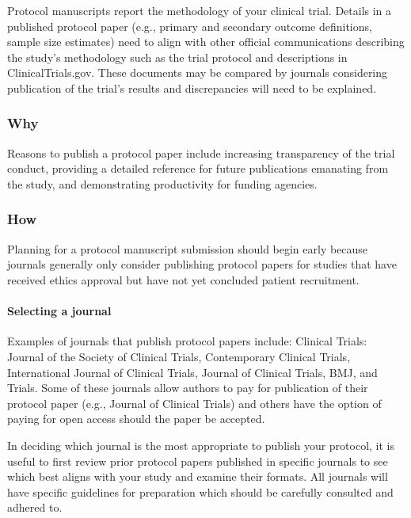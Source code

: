 \documentclass[]{book}
\theoremstyle{definition}
\theoremstyle{definition}
\theoremstyle{definition}
\theoremstyle{remark}
\begin{document}
Protocol manuscripts report the methodology of your clinical trial.
Details in a published protocol paper (e.g., primary and secondary
outcome definitions, sample size estimates) need to align with other
official communications describing the study's methodology such as the
trial protocol and descriptions in ClinicalTrials.gov. These documents
may be compared by journals considering publication of the trial's
results and discrepancies will need to be explained.

\subsubsection{Why}\label{why-22}

Reasons to publish a protocol paper include increasing transparency of
the trial conduct, providing a detailed reference for future
publications emanating from the study, and demonstrating productivity
for funding agencies.

\subsubsection{How}\label{how-22}

Planning for a protocol manuscript submission should begin early because
journals generally only consider publishing protocol papers for studies
that have received ethics approval but have not yet concluded patient
recruitment.

\paragraph{Selecting a journal}\label{selecting-a-journal}

Examples of journals that publish protocol papers include: Clinical
Trials: Journal of the Society of Clinical Trials, Contemporary Clinical
Trials, International Journal of Clinical Trials, Journal of Clinical
Trials, BMJ, and Trials. Some of these journals allow authors to pay for
publication of their protocol paper (e.g., Journal of Clinical Trials)
and others have the option of paying for open access should the paper be
accepted.

In deciding which journal is the most appropriate to publish your
protocol, it is useful to first review prior protocol papers published
in specific journals to see which best aligns with your study and
examine their formats. All journals will have specific guidelines for
preparation which should be carefully consulted and adhered to.
\end{document}
